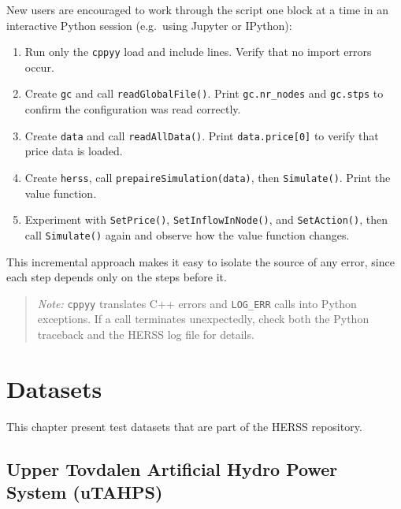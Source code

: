 \documentclass[a4paper, 12pt]{report}
\begin{document}
	New users are encouraged to work through the script one block at a time
	in an interactive Python session (e.g.\ using Jupyter or IPython):

	\begin{enumerate}
		\item Run only the \texttt{cppyy} load and include lines. Verify that
		no import errors occur.
		\item Create \texttt{gc} and call \texttt{readGlobalFile()}. Print
		\texttt{gc.nr\_nodes} and \texttt{gc.stps} to confirm the
		configuration was read correctly.
		\item Create \texttt{data} and call \texttt{readAllData()}. Print
		\texttt{data.price[0]} to verify that price data is loaded.
		\item Create \texttt{herss}, call \texttt{prepaireSimulation(data)},
		then \texttt{Simulate()}. Print the value function.
		\item Experiment with \texttt{SetPrice()}, \texttt{SetInflowInNode()},
		and \texttt{SetAction()}, then call \texttt{Simulate()} again and
		observe how the value function changes.
	\end{enumerate}

	\noindent This incremental approach makes it easy to isolate the source of
	any error, since each step depends only on the steps before it.

	\begin{quote}
		\textit{Note:} \texttt{cppyy} translates C++ errors and \texttt{LOG\_ERR}
		calls into Python exceptions. If a call terminates unexpectedly, check both
		the Python traceback and the HERSS log file for details.
	\end{quote}

	\chapter{Datasets}
	This chapter present test datasets that are part of the HERSS repository.
	
	\section{Upper Tovdalen Artificial Hydro Power System (uTAHPS)}
	
\end{document}
